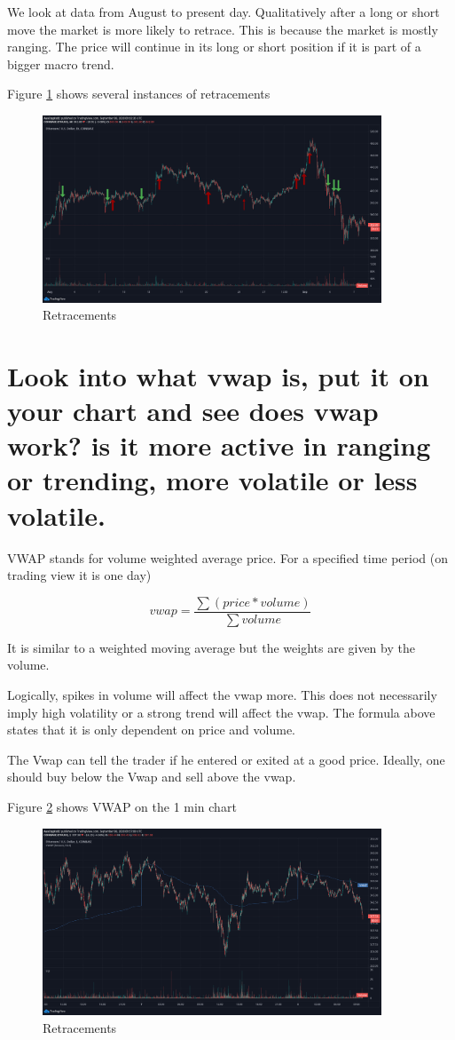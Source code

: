 We look at data from August to present day. Qualitatively after a long or short move the market is more likely to retrace. This is because the market is mostly ranging. The price will continue in its long or short position if it is part of a bigger macro trend. 

Figure \ref{fig:ret2} shows several instances of retracements
\begin{figure}[H]
\center
\includegraphics[width=0.9\textwidth]{fig/ret2.png}
\caption{Retracements}
\label{fig:ret2}
\end{figure}


\section{ Look into what vwap is, put it on your chart and see does vwap work? is it more active in ranging or trending, more volatile or less volatile.}
VWAP  stands for volume weighted average price. For a specified time period (on trading view it is one day) 

$$vwap = \frac{\sum (price * volume)}{\sum volume}$$

It is similar to a weighted moving average but the weights are given by the volume.

Logically, spikes in volume will affect the vwap more. This does not necessarily imply high volatility or a strong trend will affect the vwap. The formula above states that it is only dependent on price and volume.

The Vwap can tell the trader if he entered or exited at a good price.  Ideally, one should buy below the Vwap and sell above the vwap.

Figure \ref{fig:vwap} shows VWAP on the 1 min chart
\begin{figure}[H]
\center
\includegraphics[width=0.9\textwidth]{fig/vwap.png}
\caption{Retracements}
\label{fig:vwap}
\end{figure}


